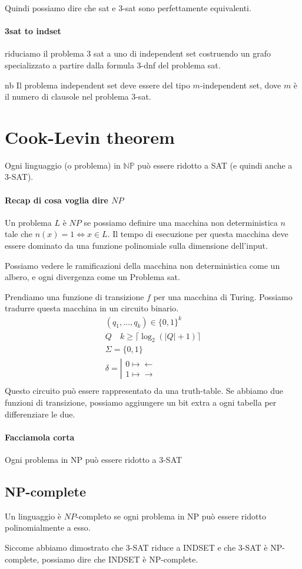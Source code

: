 \documentclass{article}
\begin{document}
Quindi possiamo dire che sat e 3-sat sono perfettamente equivalenti.

\paragraph{3sat to indset} riduciamo il problema 3 sat a uno di independent set costruendo un grafo specializzato a partire dalla formula 3-dnf del problema sat.
\begin{callout}{nb}
    Il problema independent set deve essere del tipo $m$-independent set, dove $m$ è il numero di clausole nel problema 3-sat.
\end{callout}

\section{Cook-Levin theorem}
Ogni linguaggio (o problema) in $\mathbb{NP}$ può essere ridotto a SAT (e quindi anche a 3-SAT).

\paragraph{Recap di cosa voglia dire $NP$} Un problema $L$ è $NP$ se possiamo definire una macchina non deterministica $n$ tale che $n(x)=1\iff x\in L$. Il tempo di esecuzione per questa macchina deve essere dominato da una funzione polinomiale sulla dimensione dell'input.

Possiamo vedere le ramificazioni della macchina non deterministica come un albero, e ogni divergenza come un Problema sat.

Prendiamo una funzione di transizione $f$ per una macchina di Turing. Possiamo tradurre questa macchina in un circuito binario.
\begin{gather*}
    (q_1,\dots,q_k) \in \{0,1\}^k \\
    Q\quad k\geq \lceil \log_2(|Q|+1)\rceil \\
    \Sigma = \{0,1\} \\
    \delta = \left|\begin{array}{c}0\mapsto\leftarrow\\1\mapsto\rightarrow\end{array}\right. \\
\end{gather*}
Questo circuito può essere rappresentato da una truth-table.
Se abbiamo due funzioni di transizione, possiamo aggiungere un bit extra a ogni tabella per differenziare le due.

\paragraph{Facciamola corta} Ogni problema in NP può essere ridotto a 3-SAT

\subsection{NP-complete}
Un linguaggio è $NP$-completo se ogni problema in NP può essere ridotto polinomialmente a esso.

Siccome abbiamo dimostrato che 3-SAT riduce a INDSET e che 3-SAT è NP-complete, possiamo dire che INDSET è NP-complete.
\end{document}
